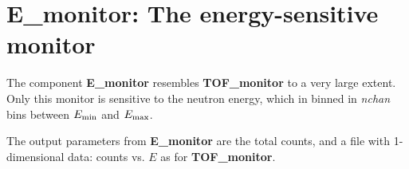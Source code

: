 
\section{E\_monitor: The energy-sensitive monitor}

The component {\bf E\_monitor} resembles {\bf TOF\_monitor}
to a very large extent. Only this monitor is sensitive to
the neutron energy, which in binned in \textit{nchan} bins between
$E_{\rm min}$ and $E_{\rm max}$.

The output parameters from {\bf E\_monitor} are the total counts, 
and a file with 1-dimensional data: counts vs. $E$ as for {\bf TOF\_monitor}.



